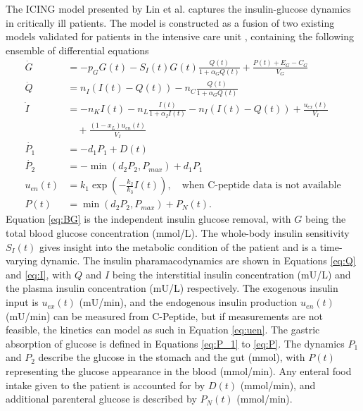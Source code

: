 \documentclass[nomenclature, english, bibtex]{kththesis}
\begin{document}
The \gls{ICING} model presented by Lin et al. \cite{lin_physiological_2011} captures the insulin-glucose dynamics in critically ill patients. The model is constructed as a fusion of two existing models validated for patients in the intensive care unit \cite{chase_model-based_nodate} \cite{lotz_monte_2008}, containing the following ensemble of differential equations
\begin{subequations}
    \begin{align}
        \dot{G} &= - p_{G}G(t) - S_{I}(t)G(t)\frac{Q(t)}{1+\alpha_{G}Q(t)} + \frac{P(t)+E_G-C_G}{V_G} \label{eq:BG} \\
        \dot{Q} &= n_{I}(I(t)-Q(t))-n_{C}\frac{Q(t)}{1+\alpha_{G}Q(t)} \label{eq:Q} \\
        \dot{I} &= -n_{K}I(t) - n_{L}\frac{I(t)}{1+\alpha_{I}I(t)} - n_{I}(I(t)-Q(t)) + \frac{u_{ex}(t)}{V_I} \nonumber \\
                &\quad + \frac{(1-x_{L})u_{en}(t)}{V_I} \label{eq:I} \\
        \dot{P_1} &= -d_{1}P_1 + D(t) \label{eq:P_1} \\
        \dot{P_2} &= -\min\left(d_{2}P_2,P_{max}\right) + d_{1}P_1 \label{eq:P_2} \\
        u_{en}(t) &= k_1 \exp\left(-\frac{k_{2}}{k_{3}}I(t)\right), \quad
                    \text{when C-peptide data is not available} \label{eq:uen} \\
        P(t) &= \min\left(d_{2}P_2,P_{max}\right) + P_N(t). \label{eq:P}
    \end{align}
\end{subequations}
Equation \eqref{eq:BG} is the independent insulin glucose removal, with $G$ being the total blood glucose concentration (mmol/L). The whole-body insulin sensitivity $S_I(t)$ gives insight into the metabolic condition of the patient and is a time-varying dynamic. The insulin pharamacodynamics are shown in Equations \eqref{eq:Q} and \eqref{eq:I}, with $Q$ and $I$ being the interstitial insulin concentration (mU/L) and the plasma insulin concentration (mU/L) respectively. The exogenous insulin input is $u_{ex}(t)$ (mU/min), and the endogenous insulin production $u_{en}(t)$ (mU/min) can be measured from C-Peptide, but if measurements are not feasible, the kinetics can model as such in Equation \eqref{eq:uen}. The gastric absorption of glucose is defined in Equations \eqref{eq:P_1} to \eqref{eq:P}. The dynamics $P_1$ and $P_2$ describe the glucose in the stomach and the gut (mmol), with $P(t)$ representing the glucose appearance in the blood (mmol/min). Any enteral food intake given to the patient is accounted for by $D(t)$ (mmol/min), and additional parenteral glucose is described by $P_N(t)$ (mmol/min).
\end{document}
